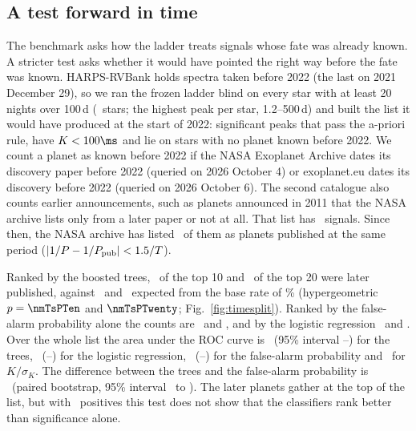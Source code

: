 \subsection{A test forward in time}
\label{sec:timesplit}

The benchmark asks how the ladder treats signals whose fate was already known. A stricter
test asks whether it would have pointed the right way before the fate was known.
HARPS-RVBank holds spectra taken before 2022 (the last on 2021 December 29), so we ran the
frozen ladder blind on every star with at least 20 nights over 100\,d (\nmTsStars\ stars;
the highest peak per star, 1.2--500\,d) and built the list it would have produced at the
start of 2022: significant peaks that pass the a-priori rule, have $K < 100\ms$ and lie on
stars with no planet known before 2022. We count a planet as known before 2022 if the NASA
Exoplanet Archive dates its discovery paper before 2022 (queried on 2026 October 4) or
exoplanet.eu dates its discovery before 2022 (queried on 2026 October 6). The second
catalogue also counts earlier announcements, such as planets announced in 2011
\citep{Mayor2011} that the NASA archive lists only from a later paper or not at all. That
list has \nmTsN\ signals. Since then, the NASA archive has listed \nmTsHits\ of them as
planets published at the same period ($|1/P - 1/P_{\rm pub}| < 1.5/T$).

Ranked by the boosted trees, \nmTsTreeTen\ of the top 10 and \nmTsTreeTwenty\ of the top 20
were later published, against \nmTsExpTen\ and \nmTsExpTwenty\ expected from the base rate
of \nmTsBase\% (hypergeometric $p = \nmTsPTen$ and $\nmTsPTwenty$;
Fig.~\ref{fig:timesplit}). Ranked by the false-alarm probability alone the counts are
\nmTsFapTen\ and \nmTsFapTwenty, and by the logistic regression \nmTsLogTen\ and
\nmTsLogTwenty. Over the whole list the area under the ROC curve is \nmTsAucTree\ (95\%
interval \nmTsAucTreeLo--\nmTsAucTreeHi) for the trees, \nmTsAucLog\
(\nmTsAucLogLo--\nmTsAucLogHi) for the logistic regression, \nmTsAucFap\
(\nmTsAucFapLo--\nmTsAucFapHi) for the false-alarm probability and \nmTsAucSnr\ for
$K/\sigma_K$. The difference between the trees and the false-alarm probability is
\nmTsDauc\ (paired bootstrap, 95\% interval \nmTsDaucLo\ to \nmTsDaucHi). The later planets gather at the top of the list, but with
\nmTsHits\ positives this test does not show that the classifiers rank better than
significance alone.

